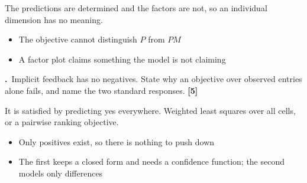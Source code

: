 \documentclass[11pt,a4paper]{article}
\newcounter{exq}[section]
\newcommand{\question}[2]{%
  \refstepcounter{exq}%
  \medskip
  \noindent
  \begin{minipage}{\textwidth}
    \textbf{\theexq.}~#1 \hfill{\color{aimlmuted}\textbf{[#2]}}
  \end{minipage}\par}
\begin{document}
\begin{solution}[title={Solution}]
The predictions are determined and the factors are not, so an individual dimension has no meaning.
\begin{itemize}[leftmargin=*,nosep]
  \item The objective cannot distinguish $P$ from $PM$
  \item A factor plot claims something the model is not claiming
\end{itemize}
\end{solution}
\question{Implicit feedback has no negatives. State why an objective over observed entries alone fails, and name the two standard responses.}{5}
\begin{solution}[title={Solution}]
It is satisfied by predicting yes everywhere. Weighted least squares over all cells, or a pairwise ranking objective.
\begin{itemize}[leftmargin=*,nosep]
  \item Only positives exist, so there is nothing to push down
  \item The first keeps a closed form and needs a confidence function; the second models only differences
\end{itemize}
\end{solution}
\end{document}
